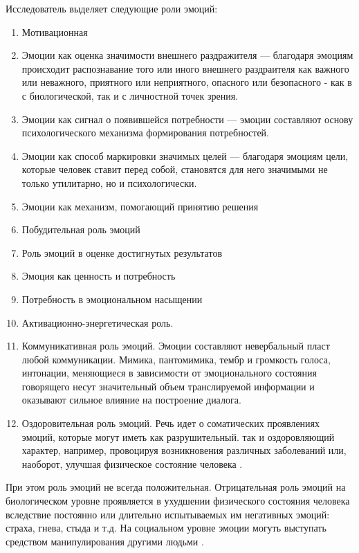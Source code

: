 \documentclass{../../common/thesisbyxetex}
\begin{document}
Исследователь выделяет следующие роли эмоций:
\begin{enumerate}
 \item Мотивационная
 \item Эмоции как оценка значимости внешнего раздражителя --- благодаря эмоциям происходит 
распознавание того или иного внешнего раздраителя как важного или неважного, приятного или 
неприятного, опасного или безопасного - как в с биологической, так и с личностной точек зрения. 
 \item Эмоции как сигнал о появившейся потребности --- эмоции составляют основу психологического 
механизма формирования потребностей.
 \item Эмоции как способ маркировки значимых целей --- благодаря эмоциям цели, которые человек 
ставит перед собой, становятся для него значимыми не только утилитарно, но и психологически.
 \item Эмоции как механизм, помогающий принятию решения
 \item Побудительная роль эмоций
 \item Роль эмоций в оценке достигнутых результатов
 \item Эмоция как ценность и потребность
 \item Потребность в эмоциональном насыщении
 \item Активационно-энергетическая роль. 
 \item Коммуникативная роль эмоций. 
 Эмоции составляют невербальный пласт любой коммуникации. Мимика, пантомимика, тембр и громкость 
голоса, интонации, меняющиеся в зависимости от эмоционального состояния говорящего несут 
значительный объем транслируемой информации и оказывают сильное влияние на построение диалога.
 \item Оздоровительная роль эмоций.
 Речь идет о соматических проявлениях эмоций, которые могут иметь как разрушительный. так и 
оздоровляющий характер, например, провоцируя возникновения различных заболеваний или, наоборот,  
улучшая физическое состояние человека \cite[110-117]{ilemo}.
\end{enumerate}   

При этом роль эмоций не всегда положительная. Отрицательная роль эмоций на биологическом уровне 
проявляется в ухудшении физического состояния человека вследствие постоянно или длительно 
испытываемых им негативных эмоций: страха, гнева, стыда и т.д. 
На социальном уровне эмоции могуть выступать средством манипулирования 
другими людьми  \cite[117]{ilemo}.
 
\end{document}
